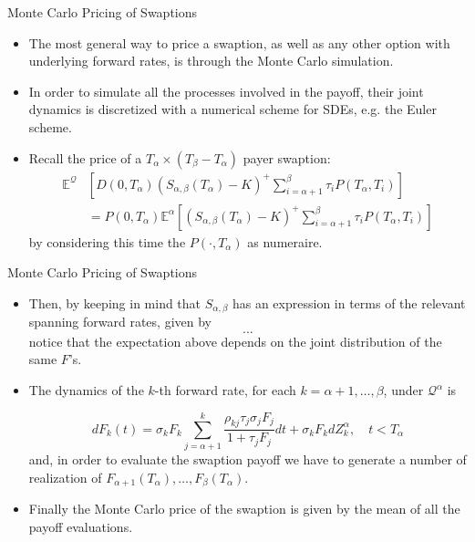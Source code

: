\documentclass{beamer}
\begin{document}
\begin{frame}{Monte Carlo Pricing of Swaptions}
\begin{itemize}
\item The most general way to price a swaption, as well as any other option with underlying forward rates, is through the Monte Carlo simulation. 
\item In order to simulate all the processes involved in the payoff, their joint dynamics is discretized with a numerical scheme for SDEs, e.g. the Euler scheme.
\item Recall the price of a $T_\alpha\times(T_\beta - T_\alpha)$ payer swaption:
\begin{equation*}
	\begin{aligned}
\mathbb{E}^\mathcal{Q}&\left[D(0, T_\alpha) (S_{\alpha,\beta}(T_\alpha) - K)^+ \sum_{i=\alpha+1}^\beta \tau_i P(T_\alpha, T_i)\right] \\
&= P(0, T_\alpha)\mathbb{E}^\alpha\left[(S_{\alpha, \beta}(T_\alpha) - K)^+ \sum^\beta_{i=\alpha+1} \tau_i P(T_\alpha, T_i)\right]
\end{aligned}
\end{equation*}
by considering this time the $P(\cdot, T_\alpha)$ as numeraire.
\end{itemize}
\end{frame}

\begin{frame}{Monte Carlo Pricing of Swaptions}
\begin{itemize}
\item Then, by keeping in mind that $S_{\alpha,\beta}$ has an expression in terms of the relevant spanning forward rates, given by
\begin{equation*}
...
\end{equation*}
notice that the expectation above depends on the joint distribution of the same $F$’s.
\item The dynamics of the $k$-th forward rate, for each $k = \alpha + 1,\ldots, \beta$, under $\mathcal{Q}^\alpha$ is

\begin{equation}
dF_k(t) = \sigma_kF_k\sum_{j=\alpha+1}^k\frac{\rho_{kj}\tau_j\sigma_jF_j}{1+\tau_jF_j}dt+\sigma_kF_k dZ^\alpha_k, \quad t<T_\alpha
\label{eq:dynamics_4.1}
\end{equation}
and, in order to evaluate the swaption payoff we have to generate a number of realization of $F_{\alpha+1}(T_\alpha),\ldots, F_\beta(T_\alpha)$. 
\item Finally the Monte Carlo price of the swaption is given by the mean of all the payoff evaluations.
\end{itemize}
\end{frame}
\end{document}
